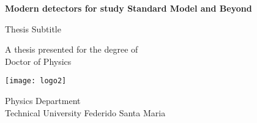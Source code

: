 \begin{titlepage}
	\begin{center}
		\vspace*{1cm}

		\Huge
		\textbf{Modern detectors for study Standard Model and Beyond}
		
		\vspace{0.5cm}
		\LARGE
		Thesis Subtitle

		\vspace{1.5cm}

		\vfill

		A thesis presented for the degree of\\
		Doctor of Physics

		\vspace{0.8cm}

		\texttt{[image: logo2]}

		\Large
		Physics Department \\
		Technical University Federido Santa Maria \\
	\end{center}
\end{titlepage}

